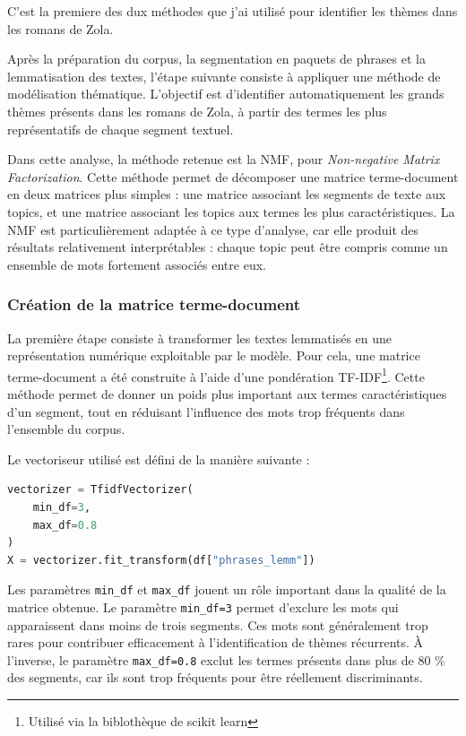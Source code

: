\documentclass{article}
\begin{document}
C'est la premiere des dux méthodes que j'ai utilisé pour identifier les thèmes dans les romans de Zola.

Après la préparation du corpus, la segmentation en paquets de phrases et la lemmatisation des textes, l'étape suivante consiste à appliquer une méthode de modélisation thématique. L'objectif est d'identifier automatiquement les grands thèmes présents dans les romans de Zola, à partir des termes les plus représentatifs de chaque segment textuel.

Dans cette analyse, la méthode retenue est la NMF, pour \textit{Non-negative Matrix Factorization}. Cette méthode permet de décomposer une matrice terme-document en deux matrices plus simples : une matrice associant les segments de texte aux topics, et une matrice associant les topics aux termes les plus caractéristiques. La NMF est particulièrement adaptée à ce type d'analyse, car elle produit des résultats relativement interprétables : chaque topic peut être compris comme un ensemble de mots fortement associés entre eux.

\subsubsection{Création de la matrice terme-document}

La première étape consiste à transformer les textes lemmatisés en une représentation numérique exploitable par le modèle. Pour cela, une matrice terme-document a été construite à l'aide d'une pondération TF-IDF\footnote{Utilisé via la biblothèque de scikit learn}. Cette méthode permet de donner un poids plus important aux termes caractéristiques d'un segment, tout en réduisant l'influence des mots trop fréquents dans l'ensemble du corpus.

Le vectoriseur utilisé est défini de la manière suivante :

\begin{lstlisting}[language=Python, caption={Création de la matrice terme-document avec TF-IDF}]
vectorizer = TfidfVectorizer(
    min_df=3,
    max_df=0.8
)
X = vectorizer.fit_transform(df["phrases_lemm"])
\end{lstlisting}

Les paramètres \texttt{min\_df} et \texttt{max\_df} jouent un rôle important dans la qualité de la matrice obtenue. Le paramètre \texttt{min\_df=3} permet d'exclure les mots qui apparaissent dans moins de trois segments. Ces mots sont généralement trop rares pour contribuer efficacement à l'identification de thèmes récurrents. À l'inverse, le paramètre \texttt{max\_df=0.8} exclut les termes présents dans plus de 80 \% des segments, car ils sont trop fréquents pour être réellement discriminants.
\end{document}
